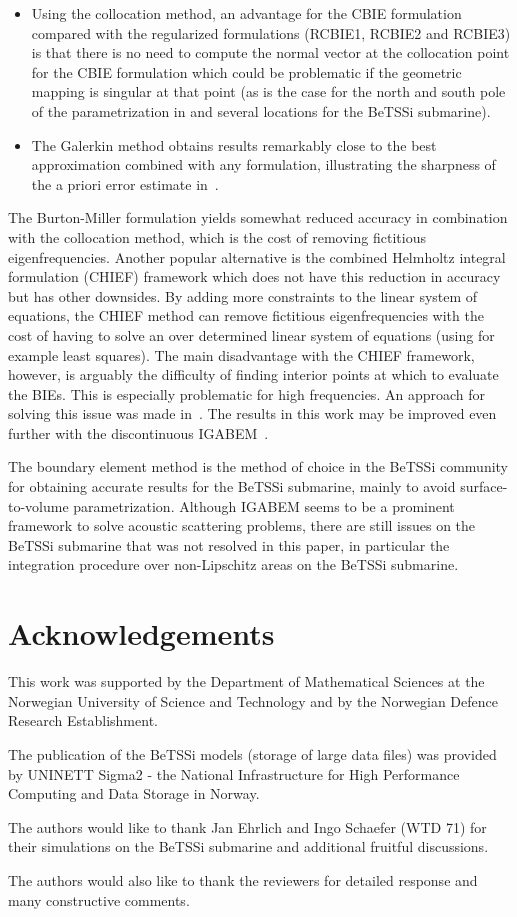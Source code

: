 \begin{itemize}
	\item Using the collocation method, an advantage for the CBIE formulation compared with the regularized formulations (RCBIE1, RCBIE2 and RCBIE3) is that there is no need to compute the normal vector at the collocation point for the CBIE formulation which could be problematic if the geometric mapping is singular at that point (as is the case for the north and south pole of the parametrization in  and several locations for the BeTSSi submarine).
	\item The Galerkin method obtains results remarkably close to the best approximation combined with any formulation, illustrating the sharpness of the a priori error estimate in~.
\end{itemize}
The Burton-Miller formulation yields somewhat reduced accuracy in combination with the collocation method, which is the cost of removing fictitious eigenfrequencies. Another popular alternative is the combined Helmholtz integral formulation (CHIEF) framework which does not have this reduction in accuracy but has other downsides. By adding more constraints to the linear system of equations, the CHIEF method can remove fictitious eigenfrequencies with the cost of having to solve an over determined linear system of equations (using for example least squares). The main disadvantage with the CHIEF framework, however, is arguably the difficulty of finding interior points at which to evaluate the BIEs. This is especially problematic for high frequencies. An approach for solving this issue was made in~\cite{Wu1991awr}. The results in this work may be improved even further with the discontinuous IGABEM~\cite{Sun2019dib}.

The boundary element method is the method of choice in the BeTSSi community for obtaining accurate results for the BeTSSi submarine, mainly to avoid surface-to-volume parametrization. Although IGABEM seems to be a prominent framework to solve acoustic scattering problems, there are still issues on the BeTSSi submarine that was not resolved in this paper, in particular the integration procedure over non-Lipschitz areas on the BeTSSi submarine.

\section*{Acknowledgements}
This work was supported by the Department of Mathematical Sciences at the Norwegian University of Science and Technology and by the Norwegian Defence Research Establishment.

The publication of the BeTSSi models (storage of large data files) was provided by UNINETT Sigma2 - the National Infrastructure for High Performance Computing and Data Storage in Norway.

The authors would like to thank Jan Ehrlich and Ingo Schaefer (WTD 71) for their simulations on the BeTSSi submarine and additional fruitful discussions.

The authors would also like to thank the reviewers for detailed response and many constructive comments.
